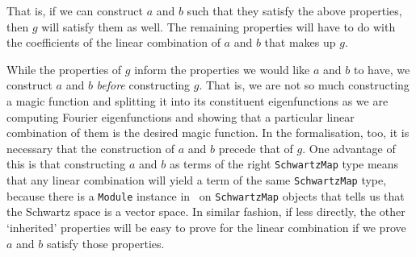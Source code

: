 That is, if we can construct $a$ and $b$ such that they satisfy the above properties, then $g$ will satisfy them as well. The remaining properties will have to do with the coefficients of the linear combination of $a$ and $b$ that makes up $g$.

While the properties of $g$ inform the properties we would like $a$ and $b$ to have, we construct $a$ and $b$ \textit{before} constructing $g$. That is, we are not so much constructing a magic function and splitting it into its constituent eigenfunctions as we are computing Fourier eigenfunctions and showing that a particular linear combination of them is the desired magic function. In the formalisation, too, it is necessary that the construction of $a$ and $b$ precede that of $g$. One advantage of this is that constructing $a$ and $b$ as terms of the right \verb|SchwartzMap| type means that any linear combination will yield a term of the same \verb|SchwartzMap| type, because there is a \verb|Module| instance in \mathlib\ on \verb|SchwartzMap| objects that tells us that the Schwartz space is a vector space. In similar fashion, if less directly, the other `inherited' properties will be easy to prove for the linear combination if we prove $a$ and $b$ satisfy those properties.

\begin{comment}
    ** Note: we gotta include PolyFourierCoeffBound somewhere!! **

    Maybe it's better to say ``here's how Viazovska did it'' and just outline her paper and then say ``here's what's different about the overall structure in Lean'' and outline a few things like the way we decided to structure the MagicFunction bit of the repo. Things like
    1. Wanting reusability: keeping `PolyFourierCoeffBound` separate
    2. Modularity: splitting it up from `ModularForms`
    3. Namespacing to avoid clashes (eg. a as a function and a as a SchwartzMap term)
    4. The strategy for the integrals: using real parametrisations and using straight contours instead of circular ones
\end{comment}